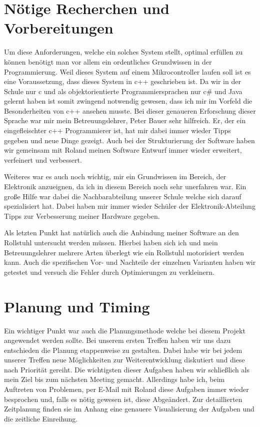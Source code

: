 \section{Nötige Recherchen und Vorbereitungen}
Um diese Anforderungen, welche ein solches System stellt, optimal erfüllen zu können benötigt man vor allem ein ordentliches Grundwissen in der Programmierung.
Weil dieses System auf einem Mikrocontroller laufen soll ist es eine Voraussetzung, dass dieses System in c++ geschrieben ist.
Da wir in der Schule nur c und als objektorientierte Programmiersprachen nur c\# und Java gelernt haben ist somit zwingend notwendig gewesen, dass ich mir im Vorfeld die Besonderheiten von c++ ansehen musste.
Bei dieser genaueren Erforschung dieser Sprache war mir mein Betreuungslehrer, Peter Bauer sehr hilfreich.
Er, der ein eingefleischter c++ Programmierer ist, hat mir dabei immer wieder Tipps gegeben und neue Dinge gezeigt.
Auch bei der Strukturierung der Software haben wir gemeinsam mit Roland meinen Software Entwurf immer wieder erweitert, verfeinert und verbessert.

Weiteres war es auch noch wichtig, mir ein Grundwissen im Bereich, der Elektronik anzueignen, da ich in diesem Bereich noch sehr unerfahren war.
Ein große Hilfe war dabei die Nachbarabteilung unserer Schule welche sich darauf spezialisiert hat.
Dabei haben mir immer wieder Schüler der Elektronik-Abteilung Tipps zur Verbesserung meiner Hardware gegeben.

Als letzten Punkt hat natürlich auch die Anbindung meiner Software an den Rollstuhl untersucht werden müssen.
Hierbei haben sich ich und mein Betreuungslehrer mehrere Arten überlegt wie ein Rollstuhl motorisiert werden kann.
Auch die spezifischen Vor- und Nachteile der einzelnen Varianten haben wir getestet und versuch die Fehler durch Optimierungen zu verkleinern.


\section{Planung und Timing}
Ein wichtiger Punkt war auch die Planungsmethode welche bei diesem Projekt angewendet werden sollte.
Bei unserem ersten Treffen haben wir uns dazu entschieden die Planung etappenweise zu gestalten.
Dabei habe wir bei jedem unserer Treffen neue Möglichkeiten zur Weiterentwicklung diskutiert und diese nach Priorität gereiht.
Die wichtigsten dieser Aufgaben haben wir schließlich als mein Ziel bis zum nächsten Meeting gemacht.
Allerdings habe ich, beim Auftreten von Problemen, per E-Mail mit Roland diese Aufgaben immer wieder besprochen und, falls es nötig gewesen ist, diese Abgeändert.
Zur detaillierten Zeitplanung finden sie im Anhang eine genauere Visualisierung der Aufgaben und die zeitliche Einreihung.


